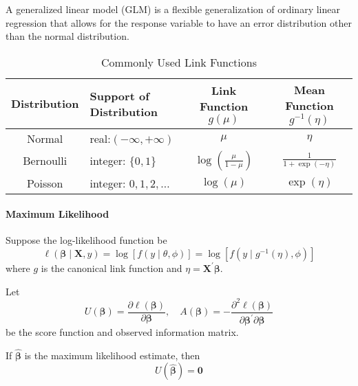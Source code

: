 \begin{remark}
    A generalized linear model (GLM) is a flexible generalization of ordinary linear regression that allows for the response variable to have an error distribution other than the normal distribution.
\end{remark}

\begin{table}[hpt]
    \centering
    \caption{Commonly Used Link Functions}
    \begin{tabular}{clcc}
        \toprule
        Distribution & Support of Distribution  & Link Function $g(\mu)$               & Mean Function $g^{-1}(\eta)$ \\
        \midrule
        Normal       & real:$(-\infty,+\infty)$ & $\mu$                                & $\eta$                       \\
        Bernoulli    & integer: $\{0,1\}$       & $\log\left(\frac{\mu}{1-\mu}\right)$ & $\frac{1}{1+\exp(-\eta)}$    \\
        Poisson      & integer: $0,1,2,\ldots$  & $\log\left(\mu\right)$               & $\exp\left(\eta\right)$      \\
        \bottomrule
    \end{tabular}
\end{table}

\paragraph{Maximum Likelihood}

Suppose the log-likelihood function be
\begin{equation}
    \ell\left(\boldsymbol{\beta}\mid\mathbf{X},y\right)=\log\left[f\left(y\mid\theta,\phi\right)\right]=\log\left[f\left(y\mid g^{-1}(\eta),\phi\right)\right]
\end{equation}
where $g$ is the canonical link function and $\eta=\mathbf{X}^{\prime}\boldsymbol{\beta}$.

Let
\begin{equation*}
    U\left(\boldsymbol{\beta}\right)=\frac{\partial\ell\left(\boldsymbol{\beta}\right)}{\partial\boldsymbol{\beta}},\quad A\left(\boldsymbol{\beta}\right)=-\frac{\partial^{2}\ell\left(\boldsymbol{\beta}\right)}{\partial\boldsymbol{\beta}^{\prime}\partial\boldsymbol{\beta}}
\end{equation*}
be the score function and observed information matrix.

If $\hat{\boldsymbol{\beta}}$ is the maximum likelihood estimate, then
\begin{equation*}
    U\left(\hat{\boldsymbol{\beta}}\right)=\mathbf{0}
\end{equation*}

